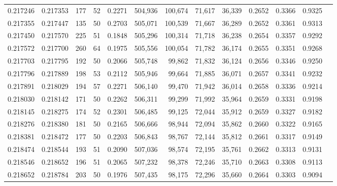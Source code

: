 \begin{tabular}{rrrrrrrrrrrrr}
0.217246 & 0.217353 &   177 &  52 &                                     0.2271 & 504,936 & 100,674 &  71,617 &  36,339 & 0.2652 & 0.3366 & 0.9325 \\
0.217355 & 0.217447 &   135 &  50 &                                     0.2703 & 505,071 & 100,539 &  71,667 &  36,289 & 0.2652 & 0.3361 & 0.9313 \\
0.217450 & 0.217570 &   225 &  51 &                                     0.1848 & 505,296 & 100,314 &  71,718 &  36,238 & 0.2654 & 0.3357 & 0.9292 \\
0.217572 & 0.217700 &   260 &  64 &                                     0.1975 & 505,556 & 100,054 &  71,782 &  36,174 & 0.2655 & 0.3351 & 0.9268 \\
0.217703 & 0.217795 &   192 &  50 &                                     0.2066 & 505,748 &  99,862 &  71,832 &  36,124 & 0.2656 & 0.3346 & 0.9250 \\
0.217796 & 0.217889 &   198 &  53 &                                     0.2112 & 505,946 &  99,664 &  71,885 &  36,071 & 0.2657 & 0.3341 & 0.9232 \\
0.217891 & 0.218029 &   194 &  57 &                                     0.2271 & 506,140 &  99,470 &  71,942 &  36,014 & 0.2658 & 0.3336 & 0.9214 \\
0.218030 & 0.218142 &   171 &  50 &                                     0.2262 & 506,311 &  99,299 &  71,992 &  35,964 & 0.2659 & 0.3331 & 0.9198 \\
0.218145 & 0.218275 &   174 &  52 &                                     0.2301 & 506,485 &  99,125 &  72,044 &  35,912 & 0.2659 & 0.3327 & 0.9182 \\
0.218276 & 0.218380 &   181 &  50 &                                     0.2165 & 506,666 &  98,944 &  72,094 &  35,862 & 0.2660 & 0.3322 & 0.9165 \\
0.218381 & 0.218472 &   177 &  50 &                                     0.2203 & 506,843 &  98,767 &  72,144 &  35,812 & 0.2661 & 0.3317 & 0.9149 \\
0.218474 & 0.218544 &   193 &  51 &                                     0.2090 & 507,036 &  98,574 &  72,195 &  35,761 & 0.2662 & 0.3313 & 0.9131 \\
0.218546 & 0.218652 &   196 &  51 &                                     0.2065 & 507,232 &  98,378 &  72,246 &  35,710 & 0.2663 & 0.3308 & 0.9113 \\
0.218652 & 0.218784 &   203 &  50 &                                     0.1976 & 507,435 &  98,175 &  72,296 &  35,660 & 0.2664 & 0.3303 & 0.9094 \\

\end{tabular}
